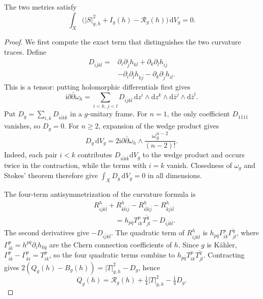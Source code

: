 \begin{proposition}\label{prop:integrated-hermitian-chern-lu}
The two metrics satisfy
\begin{equation}\label{eq:integrated-hermitian-chern-lu}
 \int_X\bigl(|S|_{g,h}^2+I_g(h)-\mathcal R_g(h)\bigr)\,\mathrm dV_g=0.
\end{equation}
\end{proposition}
\begin{proof}
We first compute the exact term that distinguishes the two curvature traces. Define
\begin{align*}
 D_{i\bar j k\bar l}
 ={}&\partial_i\partial_{\bar j}h_{k\bar l}
     +\partial_k\partial_{\bar l}h_{i\bar j}\\
   &-\partial_i\partial_{\bar l}h_{k\bar j}
     -\partial_k\partial_{\bar j}h_{i\bar l}.
\end{align*}
This is a tensor: putting holomorphic differentials first gives
\[
 \mathrm i\partial\bar\partial\omega_h
 =\sum_{i<k,\,j<l}D_{i\bar j k\bar l}
          \,\mathrm dz^i\wedge\mathrm dz^k
             \wedge\mathrm d\bar z^j\wedge\mathrm d\bar z^l.
\]
Put $D_g=\sum_{i,k}D_{i\bar i k\bar k}$ in a $g$-unitary frame. For $n=1$, the only coefficient $D_{1\bar11\bar1}$ vanishes, so $D_g=0$. For $n\geq2$, expansion of the wedge product gives
\[
 D_g\,\mathrm dV_g
 =2\mathrm i\partial\bar\partial\omega_h
                    \wedge\frac{\omega_g^{n-2}}{(n-2)!}.
\]
Indeed, each pair $i<k$ contributes $D_{i\bar i k\bar k}\mathrm dV_g$ to the wedge product and occurs twice in the contraction, while the terms with $i=k$ vanish. Closedness of $\omega_g$ and Stokes' theorem therefore give $\int_XD_g\,\mathrm dV_g=0$ in all dimensions.

The four-term antisymmetrization of the curvature formula is
\begin{align*}
 &R^h_{i\bar j k\bar l}+R^h_{k\bar l i\bar j}
  -R^h_{i\bar l k\bar j}-R^h_{k\bar j i\bar l}\\
 &\hspace{3em}=h_{p\bar q}T^p_{ik}\overline{T^q_{jl}}
                         -D_{i\bar j k\bar l}.
\end{align*}
The second derivatives give $-D_{i\bar jk\bar l}$. The quadratic term of $R^h_{i\bar jk\bar l}$ is $h_{p\bar q}\Gamma^p_{ik}\overline{\Gamma^q_{jl}}$, where $\Gamma^p_{ik}=h^{p\bar q}\partial_ih_{k\bar q}$ are the Chern connection coefficients of $h$. Since $g$ is K\"ahler, $\Gamma^p_{ik}-\Gamma^p_{ki}=T^p_{ik}$, so the four quadratic terms combine to $h_{p\bar q}T^p_{ik}\overline{T^q_{jl}}$. Contracting gives
$2(Q_g(h)-B_g(h))=|T|_{g,h}^2-D_g$, hence
\[
 Q_g(h)=\mathcal R_g(h)+\tfrac14|T|_{g,h}^2-\tfrac14D_g.
\]


\end{proof}
